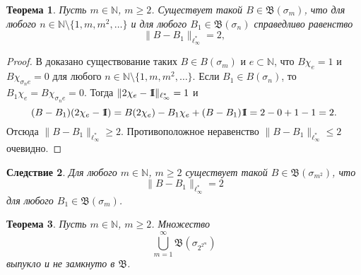 \documentclass[12pt]{article}
\newcommand{\emm}{\mathrm{1\hspace{-0.3em} I}}
\newtheorem{thm}{Теорема}
\newtheorem{cor}[thm]{Следствие}
\def\N{{\mathbb{N}}}
\def\B{{\mathfrak{B}}}
\begin{document}
\begin{thm}
Пусть $m\in \N$, $m\geqslant2$. Существует такой $B\in \B(\sigma_m)$, что для любого $n\in \N\setminus\{1, m, m^2,\dots\}$ и для любого $B_1\in \B(\sigma_n)$ справедливо равенство
\begin{equation*}\label{dl3}
\|B-B_1\|_{\ell_\infty^*}=2,
\end{equation*}
\end{thm}

\begin{proof}
В \cite[Tеорема 9]{ASSU2} доказано существование таких $B\in B(\sigma_m)$ и $e\subset \N$, что $B\chi_e =1$ и $B\chi_{\sigma_ne} =0$ для любого $n\in\N\setminus \{1, m, m^2, \dots\}$. Если $B_1\in B(\sigma_n)$, то $B_1\chi_e =B\chi_{\sigma_ne} =0$. Тогда $\|2\chi_e-\emm\|_{\ell_\infty^*}=1$ и
$$(B-B_1)(2\chi_e-\emm)=B(2\chi_e)-B_1\chi_e+(B-B_1)\emm=2-0+1-1=2.$$
Отсюда $\|B-B_1\|_{\ell_\infty^*}\geqslant2$. Противоположное неравенство $\|B-B_1\|_{\ell_\infty^*}\leqslant2$ очевидно.
\end{proof}

\begin{cor}\label{dl_cor}
Для любого $m\in \N$, $m\geqslant2$ существует такой $B\in \B(\sigma_{m^2})$, что
$$\|B-B_1\|_{\ell_\infty^*}=2 $$
 для любого $B_1\in \B(\sigma_m)$.
\end{cor}

\begin{thm}
Пусть $m\in \N$, $m\geqslant2$. Множество
\begin{equation}\label{dl4}
\bigcup_{m=1}^\infty\mathfrak B(\sigma_{2^{2^m}})
\end{equation}
выпукло и не замкнуто в $\B$.
\end{thm}
\end{document}
